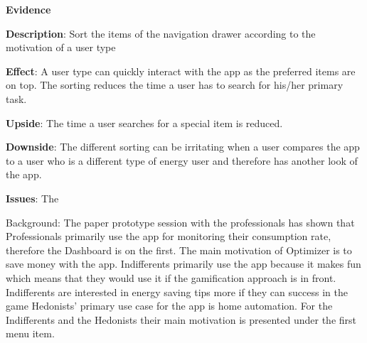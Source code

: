 \textbf{Evidence} \quad 

\textbf{Description}: Sort the items of the navigation drawer according to the motivation of a user type

\textbf{Effect}: A user type can quickly interact with the app as the preferred items are on top. The sorting reduces the time a user has to search for his/her primary task.

\textbf{Upside}: The time a user searches for a special item is reduced.

\textbf{Downside}: The different sorting can be irritating when a user compares the app to a user who is a different type of energy user and therefore has another look of the app.

\textbf{Issues}: The

Background: The paper prototype session with the professionals has shown that Professionals primarily use the app for monitoring their consumption rate, therefore the Dashboard is on the first. The main motivation of Optimizer is to save money with the app. Indifferents primarily use the app because it makes fun which means that they would use it if the gamification approach is in front. Indifferents are interested in energy saving tips more if they can success in the game
Hedonists' primary use case for the app is home automation. For the Indifferents and the Hedonists their main motivation is presented under the first menu item.